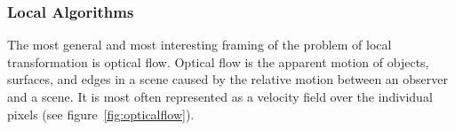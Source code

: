 \subsubsection{Local Algorithms}

The most general and most interesting framing of the problem of local transformation is optical flow.
%
Optical flow is the apparent motion of objects, surfaces, and edges in a scene caused by the relative motion between an observer and a scene.
%
It is most often represented as a velocity field over the individual pixels (see figure~\ref{fig:opticalflow}).